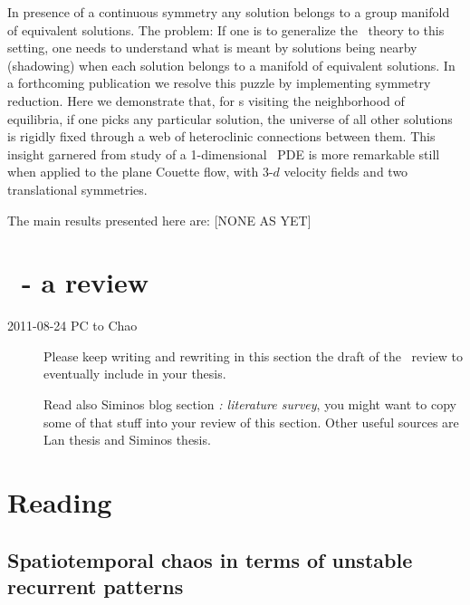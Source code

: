 In presence of a continuous symmetry any solution belongs to a group
manifold of equivalent solutions. The problem: If one is to
generalize the \po\  theory to this setting, one needs to
understand what is meant by solutions being nearby (shadowing) when
each solution belongs to a manifold of equivalent solutions. {In a
forthcoming publication we resolve this puzzle by implementing
symmetry reduction.} Here we demonstrate that, {for \rpo s visiting the
neighborhood of equilibria,} if one picks any
particular solution, the universe of all other solutions is rigidly
fixed through a web of heteroclinic connections between them. This
insight garnered from study of a 1-dimensional \KS\ PDE is more
remarkable still when applied to the plane Couette flow,
with 3-$d$ velocity fields and two translational symmetries.

The main results presented here are: [NONE AS YET]

\section{\KSe\ - a review}
\label{chap:KSreview}

\begin{description}

\item[2011-08-24 PC to Chao]
Please keep writing and rewriting in this section the draft of the
\KSe\ review to eventually include in your thesis.

Read also Siminos blog section \emph{ \KS: literature survey}, you might
want to copy some of that stuff into your review of this section. Other
useful sources are Lan thesis and Siminos
thesis.

\end{description}



\section{Reading}
\label{s:KSreading}

\subsection{Spatiotemporal chaos in terms of unstable recurrent patterns}
\label{s:Christiansen97}

